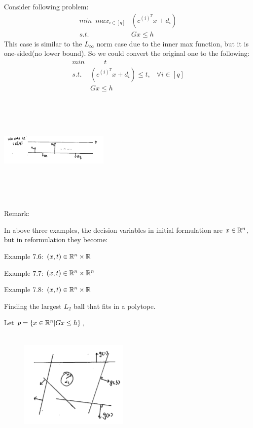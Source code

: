 \begin{example}
	Consider following problem:
	\begin{align*}
		min \,\,\, max_{i\in [q]} &(c^{(i)^T}x + d_i)\\
		s.t. &Gx\leq h
	\end{align*}
	This case is similar to the $L_\infty$ norm case due to the inner max function, but it is one-sided(no lower bound). So we could convert the original one to the following:
	\begin{align*}
		min  &\qquad t\\
		s.t. &(c^{(i)^T}x + d_i)\leq t,\,\,\,\,\, \forall i\in [q]\\
		&Gx\leq h
	\end{align*}
	\begin{marginfigure}
		\centering
		\includegraphics[width=2.1in,height=2.1in]{figures/ch07/figure1016_5.png}
	\end{marginfigure}
\end{example}

Remark:

In above three examples, the decision variables in initial formulation are $x\in \mathbb{R}^n$, but in reformulation they become:

Example 7.6: $(x, t) \in \mathbb{R}^n \times \mathbb{R}$

Example 7.7: $(x, t) \in \mathbb{R}^n \times \mathbb{R}^n$

Example 7.8: $(x, t) \in \mathbb{R}^n \times \mathbb{R}$



\begin{example}
	Finding the largest $L_2$ ball that fits in a polytope.
	
	Let $p = \{x\in \mathbb{R}^n| Gx\leq h \}$,
	
	\begin{figure}
		\centering
		\includegraphics[width=2.1in,height=2.1in]{figures/ch07/figure1016_6.png}
	\end{figure}
\end{example}


